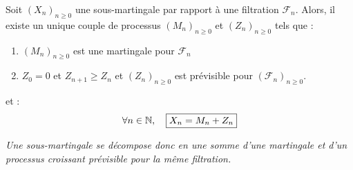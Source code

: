 \begin{theorem}
    Soit $(X_n)_{n \geqslant 0}$ une sous-martingale par rapport à une filtration $ \mathcal{F}_n$. 
    Alors, il existe un unique couple de processus $(M_n)_{n \geqslant 0}$ et $(Z_n)_{n \geqslant 0}$ tels que : 
    \begin{enumerate}[label=\roman*)]
        \item $(M_n)_{n \geqslant 0}$ est une martingale pour $ \mathcal{F}_n$ 
        \item $Z_0 = 0$ et $Z_{n+1} \geqslant Z_n$ et $(Z_n)_{n \geqslant 0}$ est prévisible pour $ (\mathcal{F}_n)_{n \geqslant 0}$. 
    \end{enumerate}
    et : 
        \begin{equation}\label{eq:doob-inequality}
            \forall n \in \mathbb{N}, \quad \boxed{X_n = M_n + Z_n}
        \end{equation}
    
    \emph{
        Une sous-martingale se décompose donc en une somme d'une martingale et 
        d'un processus croissant prévisible pour la même filtration.
    }
\end{theorem}


